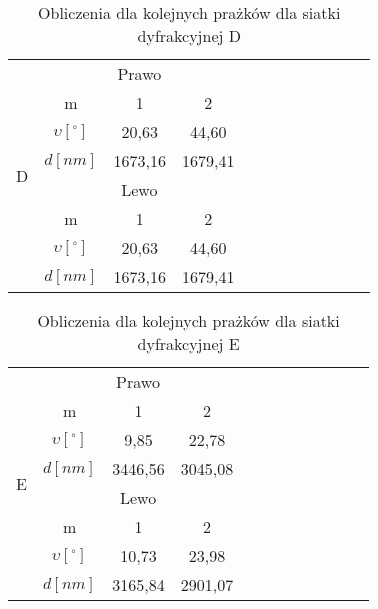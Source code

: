 \documentclass{article}
\begin{document}
\begin{table}[!ht]
    \centering
    \begin{tabular}{|c|c|c|c|c|c|c|c|c|c|c|c|}
    \hline
        \multirow{8}{*}{D}
        & \multicolumn{3}{|c|}{Prawo} \\\cline{2-4}
        & m & 1 & 2 \\ \cline{2-4}
        & $\upsilon[^\circ]$ & 20,63 & 44,60\\ \cline{2-4}
        & $d[nm]$ & 1673,16 & 1679,41     \\ \cline{2-4}
        & \multicolumn{3}{|c|}{Lewo}                \\ \cline{2-4}
        & m & 1 & 2                            \\ \cline{2-4}
        & $\upsilon[^\circ]$ & 20,63 & 44,60  \\ \cline{2-4}
        & $d[nm]$ & 1673,16 & 1679,41  \\ \hline
    \end{tabular}
    \caption{Obliczenia dla kolejnych prażków dla siatki dyfrakcyjnej D}
\end{table}

\begin{table}[!ht]
    \centering
    \begin{tabular}{|c|c|c|c|c|c|c|c|c|c|c|c|}
    \hline
        \multirow{8}{*}{E}
        & \multicolumn{3}{|c|}{Prawo} \\\cline{2-4}
        & m & 1 & 2 \\ \cline{2-4}
        & $\upsilon[^\circ]$ & 9,85 & 22,78  \\ \cline{2-4}
        & $d[nm]$ & 3446,56 & 3045,08       \\ \cline{2-4}
        & \multicolumn{3}{|c|}{Lewo}                \\ \cline{2-4}
        & m & 1 & 2                            \\ \cline{2-4}
        & $\upsilon[^\circ]$ & 10,73 & 23,98  \\ \cline{2-4}
        & $d[nm]$ & 3165,84 & 2901,07  \\ \hline
    \end{tabular}
    \caption{Obliczenia dla kolejnych prażków dla siatki dyfrakcyjnej E}
\end{table}
\end{document}
